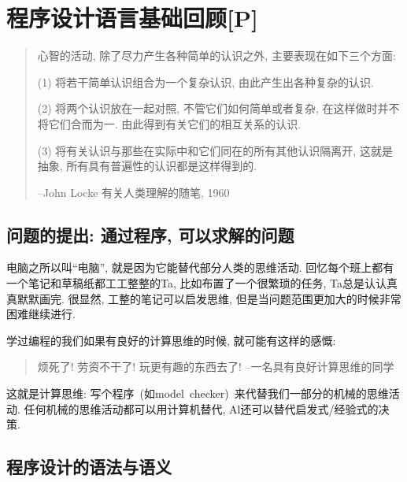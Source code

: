 \chapter{程序设计语言基础回顾[P]}
\begin{quote}
	心智的活动, 除了尽力产生各种简单的认识之外, 主要表现在如下三个方面:

(1) 将若干简单认识组合为一个复杂认识, 由此产生出各种复杂的认识. 

(2) 将两个认识放在一起对照, 不管它们如何简单或者复杂, 在这样做时并不将它们合而为一. 由此得到有关它们的相互关系的认识. 

(3) 将有关认识与那些在实际中和它们同在的所有其他认识隔离开, 这就是抽象, 所有具有普遍性的认识都是这样得到的. 

\hfill --John Locke 有关人类理解的随笔, 1960

\end{quote}

\section{问题的提出: 通过程序, 可以求解的问题}

电脑之所以叫“电脑”, 就是因为它能替代部分人类的思维活动. 回忆每个班上都有一个笔记和草稿纸都工工整整的Ta, 比如布置了一个很繁琐的任务, Ta总是认认真真默默画完. 很显然, 工整的笔记可以启发思维, 但是当问题范围更加大的时候非常困难继续进行. 	

学过编程的我们如果有良好的计算思维的时候, 就可能有这样的感慨: 

\begin{quote}
	烦死了! 劳资不干了! 玩更有趣的东西去了! \hfill --一名具有良好计算思维的同学
\end{quote}

这就是计算思维: 写个程序 (如model checker) 来代替我们一部分的机械的思维活动. 任何机械的思维活动都可以用计算机替代, Al还可以替代启发式/经验式的决策. 

\section{程序设计的语法与语义}

